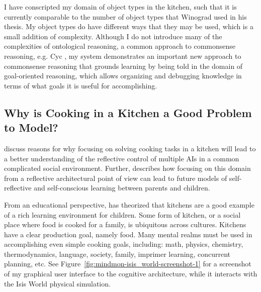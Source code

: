 I have conscripted my domain of object types in the kitchen, such
that it is currently comparable to the number of object types that
Winograd used in his thesis.  My object types do have different ways
that they may be used, which is a small addition of complexity.
Although I do not introduce many of the complexities of ontological
reasoning, a common approach to commonsense reasoning, e.g. Cyc
\citep{lenat:1990}, my system demonstrates an important new approach
to commonsense reasoning that grounds learning by being told in the
domain of goal-oriented reasoning, which allows organizing and
debugging knowledge in terms of what goals it is useful for
accomplishing.

\subsection{Why is Cooking in a Kitchen a Good Problem to Model?}

\cite{smith:2010} discuss reasons for why focusing on solving cooking
tasks in a kitchen will lead to a better understanding of the
reflective control of multiple AIs in a common complicated social
environment.  Further, \cite{morgan:2010} describes how focusing on
this domain from a reflective architectural point of view can lead to
future models of self-reflective and self-conscious learning between
parents and children.

From an educational perspective, \cite{dewey:1907} has
theorized that kitchens are a good example of a rich learning
environment for children.  Some form of kitchen, or a social place
where food is cooked for a family, is ubiquitous across cultures.
Kitchens have a clear production goal, namely food.  Many mental
realms must be used in accomplishing even simple cooking goals,
including: math, physics, chemistry, thermodynamics, language,
society, family, imprimer learning, concurrent planning, etc.  See
Figure~\ref{fig:mindmon-isis_world-screenshot-1} for a screenshot of
my graphical user interface to the cognitive architecture, while it
interacts with the Isis World physical simulation.

